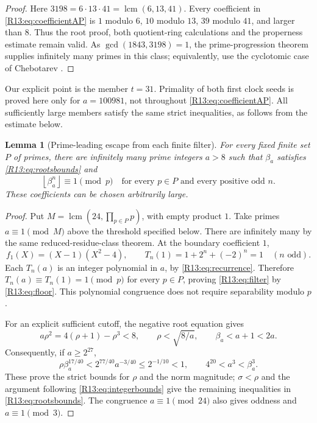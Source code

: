 \documentclass[11pt,a4paper]{article}
\newtheorem{lemma}[theorem]{Lemma}\newtheorem{proposition}[theorem]{Proposition}
\theoremstyle{definition}\newtheorem{definition}[theorem]{Definition}
\theoremstyle{remark}\newtheorem{remark}[theorem]{Remark}
\newcommand{\floor}[1]{\left\lfloor#1\right\rfloor}
\DeclareMathOperator{\lcm}{lcm}\DeclareMathOperator{\disc}{disc}\DeclareMathOperator{\Res}{Res}
\begin{document}
\begin{proof}
Here $3198=6\cdot13\cdot41=\lcm(6,13,41)$.
Every coefficient in \eqref{R13:eq:coefficientAP} is $1$ modulo $6$,
$10$ modulo $13$, $39$ modulo $41$, and larger than $8$.
Thus the root proof, both quotient-ring calculations and the
properness estimate remain valid.
As $\gcd(1843,3198)=1$, the prime-progression theorem supplies
infinitely many primes in this class; equivalently, use the
cyclotomic case of Chebotarev \cite[Theorem~3.1 and p.~4]{Lenstra}.
\end{proof}

Our explicit point is the member $t=31$.
Primality of both first clock seeds is proved here only for
$a=100981$, not throughout \eqref{R13:eq:coefficientAP}.
All sufficiently large members satisfy the same strict inequalities,
as follows from the estimate below.

\begin{lemma}[Prime-leading escape from each finite filter]
\label{R13:lem:finite}
For every fixed finite set $P$ of primes, there are infinitely many
prime integers $a>8$ such that $\beta_a$ satisfies
\eqref{R13:eq:rootsbounds} and
\begin{equation}\label{R13:eq:filter}
 \floor{\beta_a^n}\equiv1\pmod p
 \quad\text{for every }p\in P\text{ and every positive odd }n.
\end{equation}
These coefficients can be chosen arbitrarily large.
\end{lemma}

\begin{proof}
Put $M=\lcm(24,\prod_{p\in P}p)$, with empty product $1$.
Take primes $a\equiv1\pmod M$ above the threshold specified below.
There are infinitely many by the same reduced-residue-class theorem.
At the boundary coefficient $1$,
\[
 f_1(X)=(X-1)(X^2-4),\qquad
 T_n(1)=1+2^n+(-2)^n=1\quad(n\text{ odd}).
\]
Each $T_n(a)$ is an integer polynomial in $a$, by
\eqref{R13:eq:recurrence}. Therefore $T_n(a)\equiv T_n(1)=1\pmod p$
for every $p\in P$, proving \eqref{R13:eq:filter} by \eqref{R13:eq:floor}.
This polynomial congruence does not require separability modulo $p$.

For an explicit sufficient cutoff, the negative root equation gives
\[
 a\rho^2=4(\rho+1)-\rho^3<8,
 \qquad \rho<\sqrt{8/a},\qquad \beta_a<a+1<2a.
\]
Consequently, if $a\ge2^{27}$,
\[
 \rho\beta_a^{17/40}
 <2^{77/40}a^{-3/40}\le2^{-1/10}<1,
 \qquad 4^{20}<a^3<\beta_a^3.
\]
These prove the strict bounds for $\rho$ and the norm magnitude;
$\sigma<\rho$ and the argument following \eqref{R13:eq:integerbounds}
give the remaining inequalities in \eqref{R13:eq:rootsbounds}.
The congruence $a\equiv1\pmod{24}$ also gives oddness and
$a\equiv1\pmod3$.
\end{proof}
\end{document}
